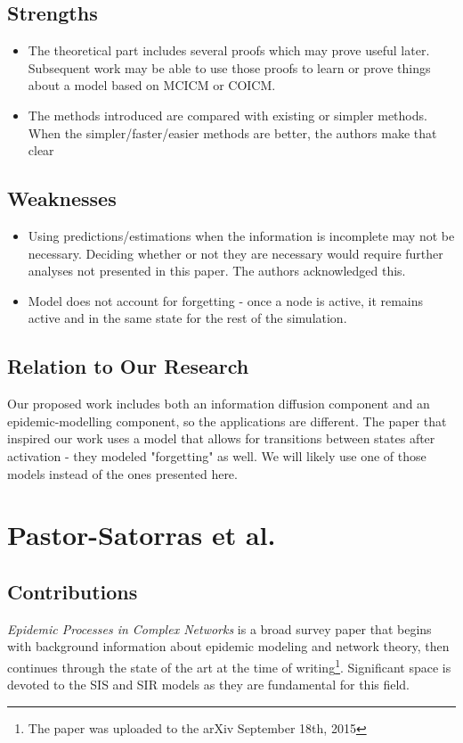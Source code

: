 \documentclass{article}
\begin{document}
    \subsection{Strengths}
    \begin{itemize}
        \item The theoretical part includes several proofs which may prove useful later. Subsequent work may be able to use those proofs to learn or prove things about a model based on MCICM or COICM.
        \item The methods introduced are compared with existing or simpler methods. When the simpler/faster/easier methods are better, the authors make that clear
    \end{itemize}
    
    \subsection{Weaknesses}
    \begin{itemize}
        \item Using predictions/estimations when the information is incomplete may not be necessary.  Deciding whether or not they are necessary would require further analyses not presented in this paper. The authors acknowledged this.
        \item Model does not account for forgetting - once a node is active, it remains active and in the same state for the rest of the simulation.
    \end{itemize}
    
    \subsection{Relation to Our Research}
    Our proposed work includes both an information diffusion component and an epidemic-modelling component, so the applications are different. The paper that inspired our work uses a model that allows for transitions between states after activation - they modeled "forgetting" as well. We will likely use one of those models instead of the ones presented here.
    
\section{Pastor-Satorras et al.}
    \subsection{Contributions}
    \textit{Epidemic Processes in Complex Networks} is a broad survey paper that begins with background information about epidemic modeling and network theory, then continues through the state of the art at the time of writing\footnote{The paper was uploaded to the arXiv September 18th, 2015}. Significant space is devoted to the SIS and SIR models as they are fundamental for this field.
    
\end{document}
